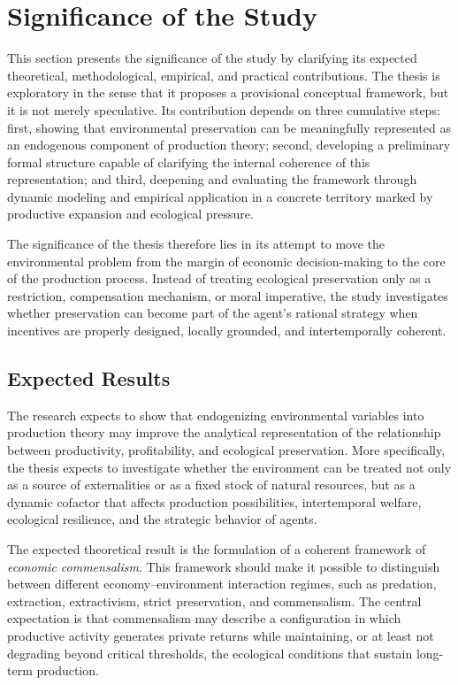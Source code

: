 

\section{Significance of the Study}

This section presents the significance of the study by clarifying its expected theoretical, methodological, empirical, and practical contributions. The thesis is exploratory in the sense that it proposes a provisional conceptual framework, but it is not merely speculative. Its contribution depends on three cumulative steps: first, showing that environmental preservation can be meaningfully represented as an endogenous component of production theory; second, developing a preliminary formal structure capable of clarifying the internal coherence of this representation; and third, deepening and evaluating the framework through dynamic modeling and empirical application in a concrete territory marked by productive expansion and ecological pressure.

The significance of the thesis therefore lies in its attempt to move the environmental problem from the margin of economic decision-making to the core of the production process. Instead of treating ecological preservation only as a restriction, compensation mechanism, or moral imperative, the study investigates whether preservation can become part of the agent's rational strategy when incentives are properly designed, locally grounded, and intertemporally coherent.

\subsection{Expected Results}

The research expects to show that endogenizing environmental variables into production theory may improve the analytical representation of the relationship between productivity, profitability, and ecological preservation. More specifically, the thesis expects to investigate whether the environment can be treated not only as a source of externalities or as a fixed stock of natural resources, but as a dynamic cofactor that affects production possibilities, intertemporal welfare, ecological resilience, and the strategic behavior of agents.

The expected theoretical result is the formulation of a coherent framework of \emph{economic commensalism}. This framework should make it possible to distinguish between different economy--environment interaction regimes, such as predation, extraction, extractivism, strict preservation, and commensalism. The central expectation is that commensalism may describe a configuration in which productive activity generates private returns while maintaining, or at least not degrading beyond critical thresholds, the ecological conditions that sustain long-term production.

